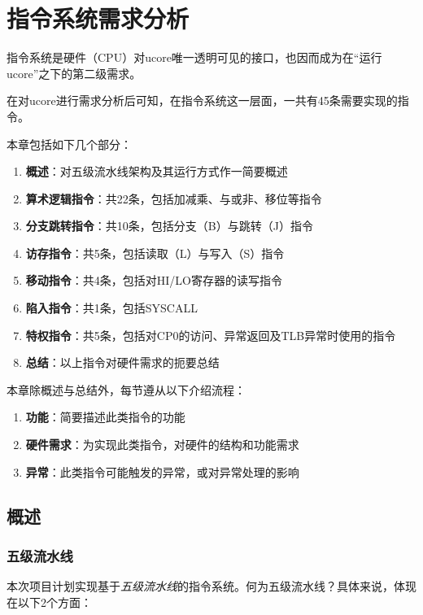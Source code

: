 \chapter{指令系统需求分析}

指令系统是硬件（CPU）对ucore唯一透明可见的接口，也因而成为在``运行ucore''之下的第二级需求。

在对ucore进行需求分析后可知，在指令系统这一层面，一共有45条需要实现的指令。

本章包括如下几个部分：

\begin{enumerate}
    \item {\bf 概述}：对五级流水线架构及其运行方式作一简要概述
    \item {\bf 算术逻辑指令}：共22条，包括加减乘、与或非、移位等指令
    \item {\bf 分支跳转指令}：共10条，包括分支（B）与跳转（J）指令
    \item {\bf 访存指令}：共5条，包括读取（L）与写入（S）指令
    \item {\bf 移动指令}：共4条，包括对HI/LO寄存器的读写指令
    \item {\bf 陷入指令}：共1条，包括SYSCALL
    \item {\bf 特权指令}：共5条，包括对CP0的访问、异常返回及TLB异常时使用的指令
    \item {\bf 总结}：以上指令对硬件需求的扼要总结
\end{enumerate}

本章除概述与总结外，每节遵从以下介绍流程：

\begin{enumerate}
    \item {\bf 功能}：简要描述此类指令的功能
    \item {\bf 硬件需求}：为实现此类指令，对硬件的结构和功能需求
    \item {\bf 异常}：此类指令可能触发的异常，或对异常处理的影响
\end{enumerate}

\section{概述}

\subsection{五级流水线}

本次项目计划实现基于\emph{五级流水线}的指令系统。何为五级流水线？具体来说，体现在以下2个方面：

